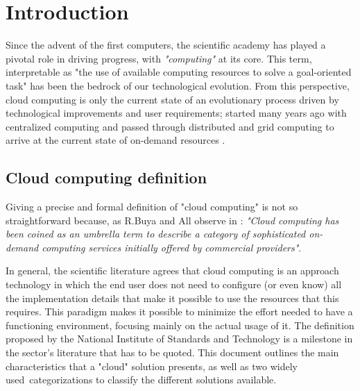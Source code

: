 \chapter{Introduction}


Since the advent of the first computers, the scientific academy has played a
pivotal role in driving progress, with \textit{"computing"} at its core. This
term, interpretable as "the use of available computing resources to solve a
goal-oriented task" has been the bedrock of our technological evolution.
From this perspective, cloud computing is only the current state of an
evolutionary process driven by technological improvements and user requirements;
started many years ago with centralized computing and passed through distributed
and grid computing to arrive at the current state of on-demand resources
\cite{Surbiryala2019CloudCH}.

\section{Cloud computing definition}

Giving a precise and formal definition of "cloud computing" is not so
straightforward because, as R.Buya and All observe in \cite{RBuyya2011}:
\textit{"Cloud computing has been coined as an umbrella term to describe a category of
sophisticated on-demand computing services initially offered by commercial providers"}.

In general, the scientific literature agrees that cloud computing is an approach
technology in which the end user does not need to configure (or even know) all
the implementation details that make it possible to use the resources that this
requires. This paradigm makes it possible to minimize the effort needed to have
a functioning environment, focusing mainly on the actual usage of it.
The definition proposed by the National Institute of Standards and Technology
\cite{nistdef} is a milestone in the sector's literature that has to be quoted.
This document outlines the main characteristics that a "cloud" solution
presents, as well as two widely used categorizations to classify the different
solutions available.

